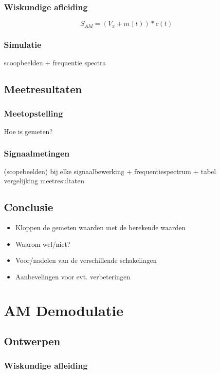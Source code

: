 \documentclass[11pt,a4paper]{article}
\begin{document}
			\subsubsection{Wiskundige afleiding}
			 	\[ S_{AM} = (V_x + m(t)) * c(t) \]

			 \subsubsection{Simulatie}
			 	scoopbeelden + frequentie spectra
		
		\subsection{Meetresultaten} 
			\subsubsection{Meetopstelling}
				Hoe is gemeten?
			\subsubsection{Signaalmetingen}
				(scopebeelden) bij elke signaalbewerking +
frequentiespectrum + tabel vergelijking meetresultaten
		
		\subsection{Conclusie}
			\begin{itemize}
				\item Kloppen de gemeten waarden met de berekende waarden
				\item Waarom wel/niet?
				\item Voor/nadelen van de verschillende schakelingen
				\item Aanbevelingen voor evt. verbeteringen
			\end{itemize}
	\clearpage

	\section{AM Demodulatie}
		\subsection{Ontwerpen}
			\subsubsection{Wiskundige afleiding}
			 	
\end{document}
